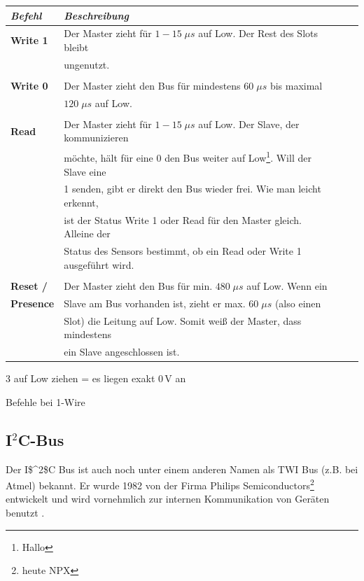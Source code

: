 \begin{threeparttable}[H]
\centering
\begin{tabular}{
llll
}
\toprule
\multicolumn{1}{p{2cm}}{\textit{Befehl} }&\multicolumn{1}{p{10cm}}{\centering\textit{Beschreibung} }\\\midrule
\textbf{Write 1} & Der Master zieht für $1-15\;\mu s$ auf Low. Der Rest des Slots bleibt \\
& ungenutzt.\\
&\\
\textbf{Write 0} & Der Master zieht den Bus für mindestens $60\;\mu s$ bis maximal\\
& $120\;\mu s$ auf Low\tnote{3}.\\
&\\
\textbf{Read}& Der Master zieht für $1-15\;\mu s$ auf Low. Der Slave, der kommunizieren\\
& möchte, hält für eine 0 den Bus weiter auf Low\footnote{Hallo}. Will der Slave eine\\
& 1 senden, gibt er direkt den Bus wieder frei. Wie man leicht erkennt,\\
& ist der Status Write 1 oder Read für den Master gleich. Alleine der \\
& Status des Sensors bestimmt, ob ein Read oder Write 1 ausgeführt wird. \\
&\\
\textbf{Reset /} & Der Master zieht den Bus für min. $480\;\mu s$ auf Low. Wenn ein\\
\textbf{Presence} & Slave am Bus vorhanden ist, zieht er max. $60\;\mu s$ (also einen\\
& Slot) die Leitung auf Low. Somit weiß der Master, dass mindestens\\
& ein Slave angeschlossen ist.\\ 
\bottomrule
\end{tabular}
\begin{tablenotes}\footnotesize
\item[3] auf Low ziehen = es liegen exakt 0\,V an
\end{tablenotes}
\caption{Befehle bei 1-Wire \citep[S. 35]{Bussysteme_in_der_Praxis}}
\label{Tabelle_Befehle_1Wire}
\end{threeparttable}

\subsection{I$^2$C-Bus}
\label{subsection_I2C}
Der \ac{I$^2$C} Bus ist auch noch unter einem anderen Namen als \ac{TWI} Bus (z.B. bei Atmel) bekannt. Er wurde 1982 von der Firma Philips Semiconductors\footnote{heute NPX} entwickelt und wird vornehmlich zur internen Kommunikation von Geräten benutzt \citep{Bussysteme_in_der_Praxis}.

